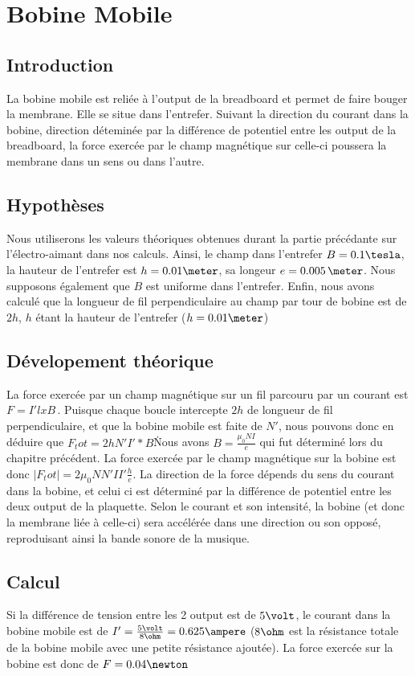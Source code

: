 \chapter{Bobine Mobile}


\section{Introduction}
La bobine mobile est reliée à l'output de la breadboard et permet de faire bouger la membrane. Elle se situe dans 
l'entrefer. Suivant la direction du courant dans la bobine, direction déteminée par la différence de potentiel
entre les output de la breadboard, la force exercée par le champ magnétique sur celle-ci poussera la 
membrane dans un sens ou dans l'autre.
\section{Hypothèses}
Nous utiliserons les valeurs théoriques obtenues durant la partie précédante sur l'électro-aimant dans nos calculs.
Ainsi, le champ dans l'entrefer $B = 0.1\tesla$, la hauteur de l'entrefer est $h = 0.01\meter$, sa longeur 
$e = 0.005\,\meter$. Nous supposons également que $B$ est uniforme dans l'entrefer. Enfin, nous avons 
calculé que la longueur de fil perpendiculaire au champ par tour de bobine est de $2h$, $h$ étant 
la hauteur de l'entrefer ($h = 0.01\meter$) 
\section{Dévelopement théorique}
La force exercée par un champ magnétique sur un fil parcouru par un courant est $F =  I' l x B$\,. Puisque 
chaque boucle intercepte $2h$ de longueur de fil perpendiculaire, et que la bobine mobile est faite de $N'$, nous pouvons
donc en déduire que $F_tot = 2h N' I' * B$\. Nous avons $B = \frac{\mu_0 N I}{e}$ qui fut déterminé 
lors du chapitre précédent. La force exercée par le champ magnétique sur la bobine est donc 
$ |F_tot| = 2 \mu_0 N N' I I' \frac{h}{e}$. La direction de la force dépends du sens du courant dans la bobine, et 
celui ci est déterminé par la différence de potentiel entre les deux output de la plaquette. Selon le courant et son
intensité, la bobine (et donc la membrane liée à celle-ci) sera accélérée dans une direction ou son opposé, reproduisant 
ainsi la bande sonore de la musique.
\section{Calcul}
Si la différence de tension entre les 2 output est de $5\volt$, le courant dans la bobine mobile est de 
$I' = \frac{5\volt}{8\ohm} = 0.625\ampere$ ($8\ohm$ est la résistance totale de la bobine mobile avec une petite 
résistance ajoutée). La force exercée sur la bobine est donc de $F = 0.04 \newton$
